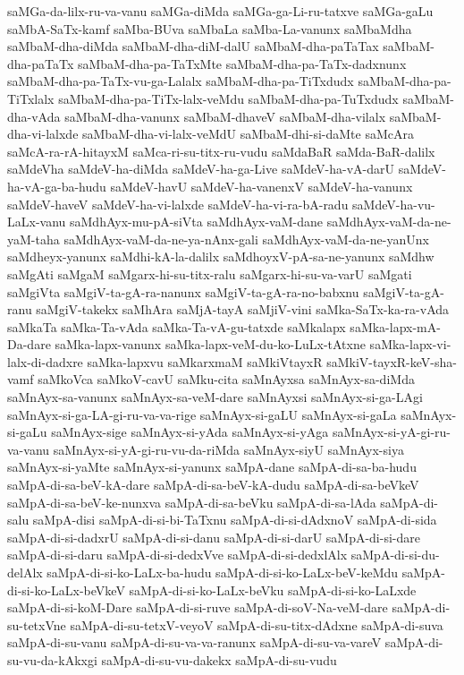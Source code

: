 {saMGa-da-lilx-ru-va-vanu
saMGa-diMda
saMGa-ga-Li-ru-tatxve
saMGa-gaLu
saMbA-SaTx-kamf
saMba-BUva
saMbaLa
saMba-La-vanunx
saMbaMdha
saMbaM-dha-diMda
saMbaM-dha-diM-dalU
saMbaM-dha-paTaTax
saMbaM-dha-paTaTx
saMbaM-dha-pa-TaTxMte
saMbaM-dha-pa-TaTx-dadxnunx
saMbaM-dha-pa-TaTx-vu-ga-Lalalx
saMbaM-dha-pa-TiTxdudx
saMbaM-dha-pa-TiTxlalx
saMbaM-dha-pa-TiTx-lalx-veMdu
saMbaM-dha-pa-TuTxdudx
saMbaM-dha-vAda
saMbaM-dha-vanunx
saMbaM-dhaveV
saMbaM-dha-vilalx
saMbaM-dha-vi-lalxde
saMbaM-dha-vi-lalx-veMdU
saMbaM-dhi-si-daMte
saMcAra
saMcA-ra-rA-hitayxM
saMca-ri-su-titx-ru-vudu
saMdaBaR
saMda-BaR-dalilx
saMdeVha
saMdeV-ha-diMda
saMdeV-ha-ga-Live
saMdeV-ha-vA-darU
saMdeV-ha-vA-ga-ba-hudu
saMdeV-havU
saMdeV-ha-vanenxV
saMdeV-ha-vanunx
saMdeV-haveV
saMdeV-ha-vi-lalxde
saMdeV-ha-vi-ra-bA-radu
saMdeV-ha-vu-LaLx-vanu
saMdhAyx-mu-pA-siVta
saMdhAyx-vaM-dane
saMdhAyx-vaM-da-ne-yaM-taha
saMdhAyx-vaM-da-ne-ya-nAnx-gali
saMdhAyx-vaM-da-ne-yanUnx
saMdheyx-yanunx
saMdhi-kA-la-dalilx
saMdhoyxV-pA-sa-ne-yanunx
saMdhw
saMgAti
saMgaM
saMgarx-hi-su-titx-ralu
saMgarx-hi-su-va-varU
saMgati
saMgiVta
saMgiV-ta-gA-ra-nanunx
saMgiV-ta-gA-ra-no-babxnu
saMgiV-ta-gA-ranu
saMgiV-takekx
saMhAra
saMjA-tayA
saMjiV-vini
saMka-SaTx-ka-ra-vAda
saMkaTa
saMka-Ta-vAda
saMka-Ta-vA-gu-tatxde
saMkalapx
saMka-lapx-mA-Da-dare
saMka-lapx-vanunx
saMka-lapx-veM-du-ko-LuLx-tAtxne
saMka-lapx-vi-lalx-di-dadxre
saMka-lapxvu
saMkarxmaM
saMkiVtayxR
saMkiV-tayxR-keV-sha-vamf
saMkoVca
saMkoV-cavU
saMku-cita
saMnAyxsa
saMnAyx-sa-diMda
saMnAyx-sa-vanunx
saMnAyx-sa-veM-dare
saMnAyxsi
saMnAyx-si-ga-LAgi
saMnAyx-si-ga-LA-gi-ru-va-va-rige
saMnAyx-si-gaLU
saMnAyx-si-gaLa
saMnAyx-si-gaLu
saMnAyx-sige
saMnAyx-si-yAda
saMnAyx-si-yAga
saMnAyx-si-yA-gi-ru-va-vanu
saMnAyx-si-yA-gi-ru-vu-da-riMda
saMnAyx-siyU
saMnAyx-siya
saMnAyx-si-yaMte
saMnAyx-si-yanunx
saMpA-dane
saMpA-di-sa-ba-hudu
saMpA-di-sa-beV-kA-dare
saMpA-di-sa-beV-kA-dudu
saMpA-di-sa-beVkeV
saMpA-di-sa-beV-ke-nunxva
saMpA-di-sa-beVku
saMpA-di-sa-lAda
saMpA-di-salu
saMpA-disi
saMpA-di-si-bi-TaTxnu
saMpA-di-si-dAdxnoV
saMpA-di-sida
saMpA-di-si-dadxrU
saMpA-di-si-danu
saMpA-di-si-darU
saMpA-di-si-dare
saMpA-di-si-daru
saMpA-di-si-dedxVve
saMpA-di-si-dedxlAlx
saMpA-di-si-du-delAlx
saMpA-di-si-ko-LaLx-ba-hudu
saMpA-di-si-ko-LaLx-beV-keMdu
saMpA-di-si-ko-LaLx-beVkeV
saMpA-di-si-ko-LaLx-beVku
saMpA-di-si-ko-LaLxde
saMpA-di-si-koM-Dare
saMpA-di-si-ruve
saMpA-di-soV-Na-veM-dare
saMpA-di-su-tetxVne
saMpA-di-su-tetxV-veyoV
saMpA-di-su-titx-dAdxne
saMpA-di-suva
saMpA-di-su-vanu
saMpA-di-su-va-va-ranunx
saMpA-di-su-va-vareV
saMpA-di-su-vu-da-kAkxgi
saMpA-di-su-vu-dakekx
saMpA-di-su-vudu
}
